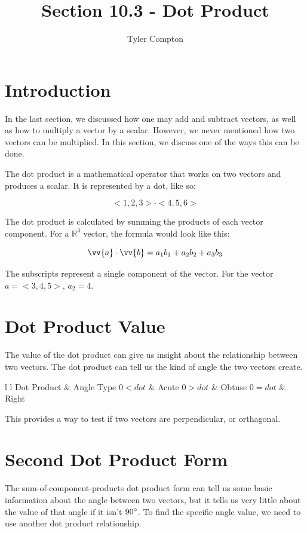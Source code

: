 \documentclass{article}
\author{Tyler Compton}
\title{Section 10.3 - Dot Product}
\begin{document}
\maketitle
\tableofcontents

\section{Introduction}
In the last section, we discussed how one may add and subtract vectors, as well
as how to multiply a vector by a scalar. However, we never mentioned how two
vectors can be multiplied. In this section, we discuss one of the ways this can
be done.

The dot product is a mathematical operator that works on two vectors and
produces a scalar. It is represented by a dot, like so:

$$<1, 2, 3> \cdot <4, 5, 6>$$

The dot product is calculated by summing the products of each vector component.
For a $\mathbb{R}^3$ vector, the formula would look like this:

$$\vv{a} \cdot \vv{b} = a_1b_1 + a_2b_2 + a_3b_3$$

The subscripts represent a single component of the vector. For the vector
$a = <3, 4, 5>$, $a_2 = 4$.

\section{Dot Product Value}
The value of the dot product can give us insight about the relationship between
two vectors. The dot product can tell us the kind of angle the two vectors
create.

\begin{table}[H]
	\centering
	\begin{tabular} { l l }
		Dot Product & Angle Type
		$0<dot$ & Acute
		$0>dot$ & Obtuse
		$0=dot$ & Right
	\end{tabular}
\end{table}

This provides a way to test if two vectors are perpendicular, or orthagonal.

\section{Second Dot Product Form}
The sum-of-component-products dot product form can tell us some basic
information about the angle between two vectors, but it tells us very little
about the value of that angle if it isn't $90\degree$. To find the specific
angle value, we need to use another dot product relationship.
\end{document}
